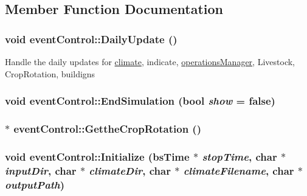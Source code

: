 \subsection{Member Function Documentation}
\hypertarget{classevent_control_a8fedd9f0953e05cbd39009bdd0b80387}{
\subsubsection[{DailyUpdate}]{\setlength{\rightskip}{0pt plus 5cm}void eventControl::DailyUpdate ()}}
\label{classevent_control_a8fedd9f0953e05cbd39009bdd0b80387}
Handle the daily updates for \hyperlink{classclimate}{climate}, indicate, \hyperlink{classoperations_manager}{operationsManager}, Livestock, CropRotation, buildigns \hypertarget{classevent_control_a6f376cef3f9304a16b1d633ea4ac4770}{
\subsubsection[{EndSimulation}]{\setlength{\rightskip}{0pt plus 5cm}void eventControl::EndSimulation (bool {\em show} = {\ttfamily false})}}
\label{classevent_control_a6f376cef3f9304a16b1d633ea4ac4770}
\hypertarget{classevent_control_aca3970196c2b30a5aa4a72952f829f20}{
\subsubsection[{GettheCropRotation}]{$\ast$ eventControl::GettheCropRotation ()}}
\label{classevent_control_aca3970196c2b30a5aa4a72952f829f20}
\hypertarget{classevent_control_abc86856c0212792527d036ac7cca53fb}{
\subsubsection[{Initialize}]{\setlength{\rightskip}{0pt plus 5cm}void eventControl::Initialize ({\bf bsTime} $\ast$ {\em stopTime}, \/  char $\ast$ {\em inputDir}, \/  char $\ast$ {\em climateDir}, \/  char $\ast$ {\em climateFilename}, \/  char $\ast$ {\em outputPath})}}
